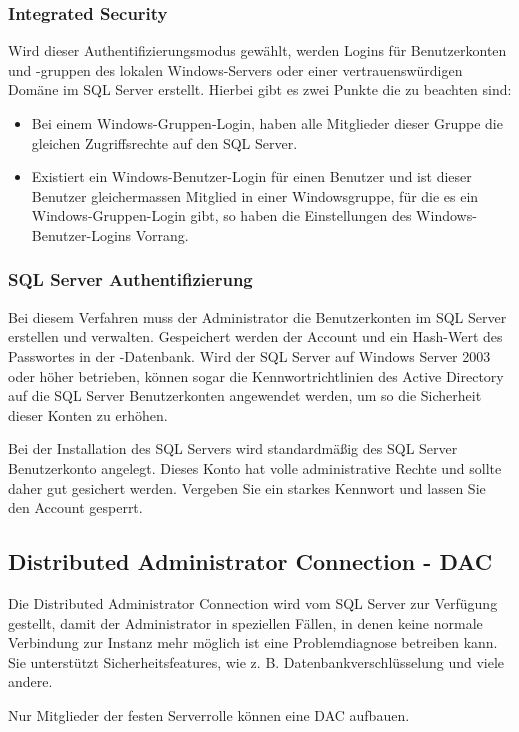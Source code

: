         \subsubsection{Integrated Security}
          Wird dieser Authentifizierungsmodus gewählt, werden
          Logins für Benutzerkonten und -gruppen des lokalen Windows-Servers
          oder einer vertrauenswürdigen Domäne im SQL Server erstellt.
          Hierbei gibt es zwei Punkte die zu beachten sind:
          \begin{itemize}
            \item Bei einem Windows-Gruppen-Login, haben alle Mitglieder dieser
            Gruppe die gleichen Zugriffsrechte auf den SQL Server.
            \item Existiert ein Windows-Benutzer-Login für einen Benutzer und
            ist dieser Benutzer gleichermassen Mitglied in einer Windowsgruppe,
            für die es ein Windows-Gruppen-Login gibt, so haben die
            Einstellungen des Windows-Benutzer-Logins Vorrang.
          \end{itemize}
        \subsubsection{SQL Server Authentifizierung}
          Bei diesem Verfahren muss der Administrator die Benutzerkonten im
          SQL Server erstellen und verwalten. Gespeichert werden der Account
          und ein Hash-Wert des Passwortes in der -Datenbank.
          Wird der SQL Server auf Windows Server 2003 oder höher betrieben,
          können sogar die Kennwortrichtlinien des Active Directory auf die SQL
          Server Benutzerkonten angewendet werden, um so die Sicherheit dieser Konten
         zu erhöhen.
         
         Bei der Installation des SQL Servers wird standardmäßig des SQL Server
         Benutzerkonto  angelegt. Dieses Konto hat volle
         administrative Rechte und sollte daher gut gesichert werden. Vergeben
         Sie ein starkes Kennwort und lassen Sie den Account gesperrt.
      \subsection{Distributed Administrator Connection - DAC}
        Die Distributed Administrator Connection wird vom SQL Server zur
        Verfügung gestellt, damit der Administrator in speziellen Fällen, in
        denen keine normale Verbindung zur Instanz mehr möglich ist eine
        Problemdiagnose betreiben kann. Sie unterstützt Sicherheitsfeatures, wie
        z. B. Datenbankverschlüsselung und viele andere.
        \begin{merke}
          Nur Mitglieder der festen Serverrolle  können
          eine DAC aufbauen.
        \end{merke}
